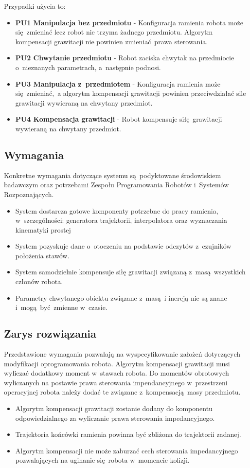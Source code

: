 Przypadki użycia to:
\begin{itemize}
	\item \textbf{PU1 Manipulacja bez przedmiotu} - Konfiguracja ramienia robota może się zmieniać lecz robot nie trzyma żadnego przedmiotu. Algorytm kompensacji grawitacji nie powinien zmieniać prawa sterowania. 
	\item \textbf{PU2 Chwytanie przedmiotu} - Robot zaciska chwytak na przedmiocie o~nieznanych parametrach, a~następnie podnosi.  
	\item \textbf{PU3 Manipulacja z~przedmiotem} - Konfiguracja ramienia może się zmieniać, a algorytm kompensacji grawitacji powinien przeciwdziałać sile grawitacji wywieraną na chwytany przedmiot.
	\item \textbf{PU4 Kompensacja grawitacji} - Robot kompensuje siłę grawitacji wywieraną na chwytany przedmiot.
\end{itemize}

\subsection{Wymagania}
Konkretne wymagania dotyczące systemu są podyktowane środowiskiem badawczym oraz potrzebami Zespołu Programowania Robotów i~Systemów Rozpoznających. 
\begin{itemize}
	\item System dostarcza gotowe komponenty potrzebne do pracy ramienia, w~szczególności: generatora trajektorii, interpolatora oraz wyznaczania kinematyki prostej 
	\item System pozyskuje dane o~otoczeniu na podstawie odczytów z~czujników położenia stawów.
	\item System samodzielnie kompensuje siłę grawitacji związaną z~masą wszystkich członów robota.
	\item Parametry chwytanego obiektu związane z~masą i inercją nie są znane i~mogą być zmienne w~czasie.
\end{itemize}

\subsection{Zarys rozwiązania}
Przedstawione wymagania pozwalają na wyspecyfikowanie założeń dotyczących modyfikacji oprogramowania robota. Algorytm kompensacji grawitacji musi wyliczać dodatkowy moment w~stawach robota. Do momentów obrotowych wyliczanych na postawie  prawa sterowania impendancyjnego w~przestrzeni operacyjnej robota należy dodać te związane z~kompensacją masy przedmiotu.
\begin{itemize}
	\item Algorytm kompensacji grawitacji zostanie dodany do komponentu odpowiedzialnego za wyliczanie prawa sterowania impedancyjnego.
	\item Trajektoria końcówki ramienia powinna być zbliżona do trajektorii zadanej.
	\item Algorytm kompensacji nie może zaburzać cech sterowania impedancyjnego pozwalających na uginanie się robota w~momencie kolizji.
\end{itemize}


